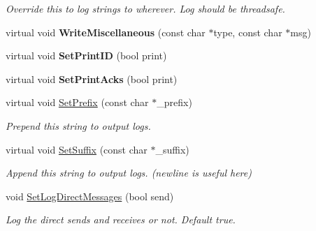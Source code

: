 \begin{DoxyCompactItemize}
\begin{DoxyCompactList}\small\item\em Override this to log strings to wherever. Log should be threadsafe. \end{DoxyCompactList}\item 
\hypertarget{class_rak_net_1_1_packet_logger_a67c24ca0c97078ca5290ec6287f7c774}{virtual void {\bfseries Write\-Miscellaneous} (const char $\ast$type, const char $\ast$msg)}\label{class_rak_net_1_1_packet_logger_a67c24ca0c97078ca5290ec6287f7c774}

\item 
\hypertarget{class_rak_net_1_1_packet_logger_a48dc88cba2792776b43c95f827fee9cf}{virtual void {\bfseries Set\-Print\-I\-D} (bool print)}\label{class_rak_net_1_1_packet_logger_a48dc88cba2792776b43c95f827fee9cf}

\item 
\hypertarget{class_rak_net_1_1_packet_logger_a21781635af3c1b6d7b1076e0af921c39}{virtual void {\bfseries Set\-Print\-Acks} (bool print)}\label{class_rak_net_1_1_packet_logger_a21781635af3c1b6d7b1076e0af921c39}

\item 
\hypertarget{class_rak_net_1_1_packet_logger_a0819da3879136df1a26b24844fb6abee}{virtual void \hyperlink{class_rak_net_1_1_packet_logger_a0819da3879136df1a26b24844fb6abee}{Set\-Prefix} (const char $\ast$\-\_\-prefix)}\label{class_rak_net_1_1_packet_logger_a0819da3879136df1a26b24844fb6abee}

\begin{DoxyCompactList}\small\item\em Prepend this string to output logs. \end{DoxyCompactList}\item 
\hypertarget{class_rak_net_1_1_packet_logger_a7b8f7d4767ddb445d2fdb344538278f5}{virtual void \hyperlink{class_rak_net_1_1_packet_logger_a7b8f7d4767ddb445d2fdb344538278f5}{Set\-Suffix} (const char $\ast$\-\_\-suffix)}\label{class_rak_net_1_1_packet_logger_a7b8f7d4767ddb445d2fdb344538278f5}

\begin{DoxyCompactList}\small\item\em Append this string to output logs. (newline is useful here) \end{DoxyCompactList}\item 
\hypertarget{class_rak_net_1_1_packet_logger_a1ca13332359a83158095b52ab686303e}{void \hyperlink{class_rak_net_1_1_packet_logger_a1ca13332359a83158095b52ab686303e}{Set\-Log\-Direct\-Messages} (bool send)}\label{class_rak_net_1_1_packet_logger_a1ca13332359a83158095b52ab686303e}

\begin{DoxyCompactList}\small\item\em Log the direct sends and receives or not. Default true. \end{DoxyCompactList}\end{DoxyCompactItemize}
